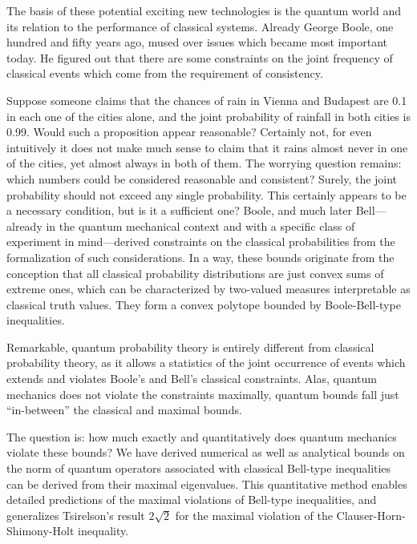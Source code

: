 \documentclass[pra,amsfonts,showpacs,preprint,showkeys]{revtex4}
\begin{document}
The basis of these potential exciting new technologies is the quantum world and its relation
to the performance of classical systems.
Already George Boole, one hundred and fifty years ago, mused over issues which became most important today.
He figured out that there are some constraints on the joint frequency of classical events
which come from the requirement of consistency.

Suppose someone claims that the chances of rain in Vienna
and Budapest are 0.1 in each one of the cities alone, and
the joint probability of rainfall in both cities is 0.99. Would
such a proposition appear reasonable? Certainly not, for even
intuitively it does not make much sense to claim that it rains
almost never in one of the cities, yet almost always in both of
them. The worrying question remains: which numbers could
be considered reasonable and consistent? Surely, the joint
probability should not exceed any single probability. This
certainly appears to be a necessary condition, but is it a sufficient
one?
Boole, and much  later Bell---already in the quantum mechanical context
and with a specific class of experiment in mind---derived constraints on the classical probabilities from the formalization of such considerations.
In a way, these bounds originate from the conception that all classical probability distributions
are just convex sums of extreme ones, which can be characterized by two-valued measures
interpretable as classical truth values.
They form a convex polytope bounded by Boole-Bell-type inequalities.

Remarkable, quantum probability theory is entirely different from classical probability theory,
as it allows a statistics of the joint occurrence of events which
extends and violates Boole's and Bell's classical constraints.
Alas,  quantum mechanics does not violate the constraints maximally,
quantum bounds fall just ``in-between'' the classical and maximal bounds.

The question is: how much exactly and quantitatively does quantum mechanics violate these bounds?
We have derived numerical as well as analytical bounds on the norm of quantum operators
associated with classical Bell-type inequalities
can be derived from their maximal eigenvalues.
This quantitative method enables detailed
predictions of the maximal violations of Bell-type inequalities,
and generalizes Tsirelson's result $2\sqrt{2}$
for the maximal violation of the Clauser-Horn-Shimony-Holt inequality.
\end{document}
